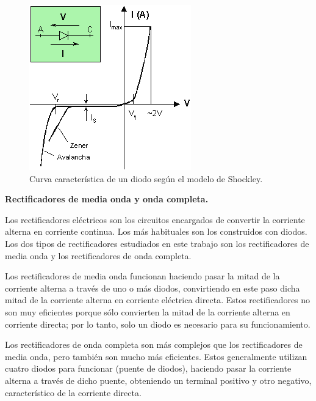 \documentclass[twoside,twocolumn,a4paper]{article}
\begin{document}
\begin{figure}[h]
\includegraphics[width=\linewidth]{curva_shockley.jpg}
\caption{Curva caracter\'istica de un diodo seg\'un el modelo de Shockley.}
\label{fig:curva_shockley}
\end{figure}


\textbf{Rectificadores de media onda y onda completa.} \newline
\par
Los rectificadores el\'ectricos son los circuitos encargados de convertir la corriente alterna en corriente continua. Los m\'as habituales son los construidos con diodos. Los dos tipos de rectificadores estudiados en este trabajo son los rectificadores de media onda y los rectificadores de onda completa. \par

Los rectificadores de media onda funcionan haciendo pasar la mitad de la corriente alterna a trav\'es de uno o m\'as diodos, convirtiendo en este paso dicha mitad de la corriente alterna en corriente el\'ectrica directa. Estos rectificadores no son muy eficientes porque s\'olo convierten la mitad de la corriente alterna en corriente directa; por lo tanto, solo un diodo es necesario para su funcionamiento.\par

Los rectificadores de onda completa son m\'as complejos que los rectificadores de media onda, pero tambi\'en son mucho m\'as eficientes. Estos generalmente utilizan cuatro diodos para funcionar (puente de diodos), haciendo pasar la corriente alterna a trav\'es de dicho puente, obteniendo un terminal positivo y otro negativo, caracter\'istico de la corriente directa.
\end{document}
